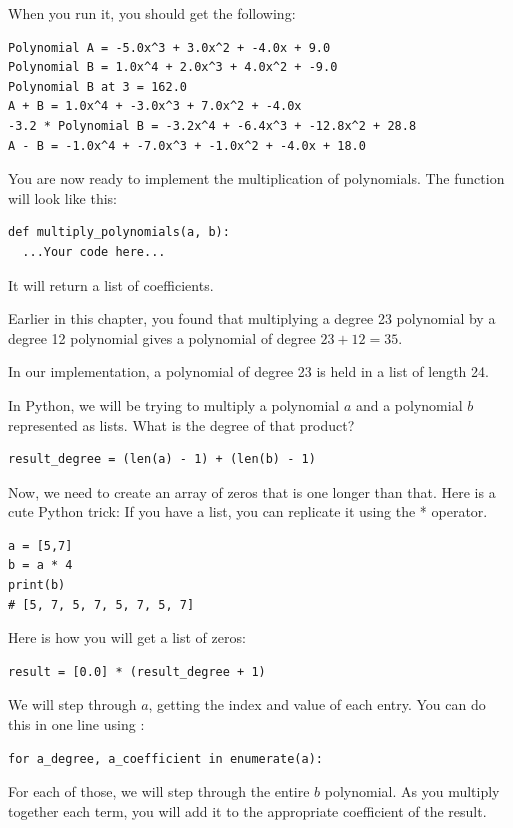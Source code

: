 When you run it, you should get the following:
\begin{verbatim}
Polynomial A = -5.0x^3 + 3.0x^2 + -4.0x + 9.0
Polynomial B = 1.0x^4 + 2.0x^3 + 4.0x^2 + -9.0
Polynomial B at 3 = 162.0
A + B = 1.0x^4 + -3.0x^3 + 7.0x^2 + -4.0x
-3.2 * Polynomial B = -3.2x^4 + -6.4x^3 + -12.8x^2 + 28.8
A - B = -1.0x^4 + -7.0x^3 + -1.0x^2 + -4.0x + 18.0
\end{verbatim}

You are now ready to implement the multiplication of polynomials. The function will look like this:
\begin{verbatim}
def multiply_polynomials(a, b):
  ...Your code here...
\end{verbatim}
It will return a list of coefficients.

Earlier in this chapter, you found that multiplying a degree 23
polynomial by a degree 12 polynomial gives a polynomial of degree
$23 + 12 = 35$.

In our implementation, a polynomial of degree 23 is held in a list of length 24.

In Python, we will be trying to multiply a polynomial $a$ and a
polynomial $b$ represented as lists. What is the degree of that product?
\begin{verbatim}
result_degree = (len(a) - 1) + (len(b) - 1)
\end{verbatim}

Now, we need to create an array of zeros that is one longer than that. Here is a cute Python trick: If you have a list, you can replicate it using the * operator. 
\begin{verbatim}
a = [5,7]
b = a * 4
print(b)
# [5, 7, 5, 7, 5, 7, 5, 7]
\end{verbatim}

Here is how you will get a list of zeros:
\begin{verbatim}
result = [0.0] * (result_degree + 1)
\end{verbatim}

We will step through $a$, getting the index and value of each entry. You can do this in one line using :
\begin{verbatim}
for a_degree, a_coefficient in enumerate(a):
\end{verbatim}
For each of those, we will step through the entire $b$ polynomial. As
you multiply together each term, you will add it to the appropriate
coefficient of the result.

